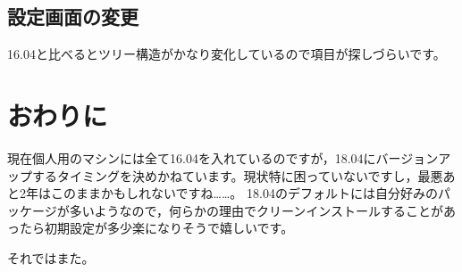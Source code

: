 \subsection{設定画面の変更}
16.04と比べるとツリー構造がかなり変化しているので項目が探しづらいです。

\section{おわりに}
現在個人用のマシンには全て16.04を入れているのですが，18.04にバージョンアップするタイミングを決めかねています。現状特に困っていないですし，最悪あと2年はこのままかもしれないですね……。
18.04のデフォルトには自分好みのパッケージが多いようなので，何らかの理由でクリーンインストールすることがあったら初期設定が多少楽になりそうで嬉しいです。

それではまた。
